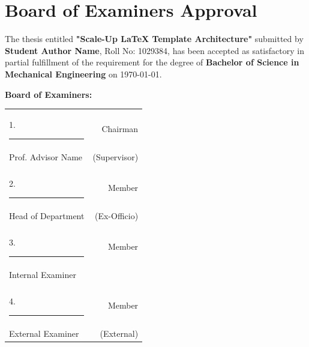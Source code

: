 \chapter*{Board of Examiners Approval}
The thesis entitled \textbf{"Scale-Up LaTeX Template Architecture"} submitted by \textbf{Student Author Name}, Roll No: 1029384, has been accepted as satisfactory in partial fulfillment of the requirement for the degree of \textbf{Bachelor of Science in Mechanical Engineering} on \today.

\vspace{1.5cm}
\noindent
\textbf{Board of Examiners:}

\vspace{1cm}
\noindent
\begin{tabular*}{\textwidth}{@{\extracolsep{\fill}}lr}
    1. \rule{6cm}{0.5pt} & Chairman \\
    Prof. Advisor Name & (Supervisor) \\
    \\
    2. \rule{6cm}{0.5pt} & Member \\
    Head of Department & (Ex-Officio) \\
    \\
    3. \rule{6cm}{0.5pt} & Member \\
    Internal Examiner & \\
    \\
    4. \rule{6cm}{0.5pt} & Member \\
    External Examiner & (External)
\end{tabular*}

